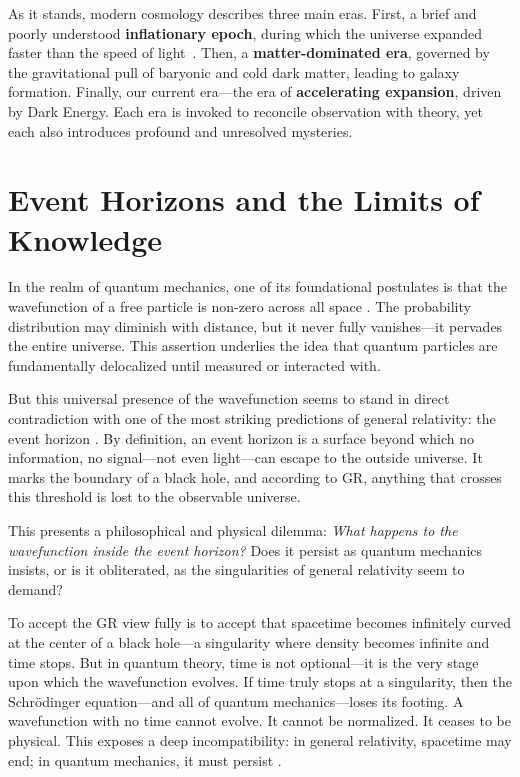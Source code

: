\documentclass[12pt]{article}
\begin{document}
As it stands, modern cosmology describes three main eras. First, a brief and poorly understood \textbf{inflationary epoch}, during which the universe expanded faster than the speed of light~\citep{guth1981}. Then, a \textbf{matter-dominated era}, governed by the gravitational pull of baryonic and cold dark matter, leading to galaxy formation. Finally, our current era---the era of \textbf{accelerating expansion}, driven by Dark Energy. Each era is invoked to reconcile observation with theory, yet each also introduces profound and unresolved mysteries.


\section{Event Horizons and the Limits of Knowledge}

In the realm of quantum mechanics, one of its foundational postulates is that the wavefunction of a free particle is non-zero across all space \citep{libretexts_qm_postulates}. The probability distribution may diminish with distance, but it never fully vanishes---it pervades the entire universe. This assertion underlies the idea that quantum particles are fundamentally delocalized until measured or interacted with.

But this universal presence of the wavefunction seems to stand in direct contradiction with one of the most striking predictions of general relativity: the event horizon \citep{britannica_event_horizon, schwarzschild1916}. By definition, an event horizon is a surface beyond which no information, no signal---not even light---can escape to the outside universe. It marks the boundary of a black hole, and according to GR, anything that crosses this threshold is lost to the observable universe.

This presents a philosophical and physical dilemma: \textit{What happens to the wavefunction inside the event horizon?} Does it persist as quantum mechanics insists, or is it obliterated, as the singularities of general relativity seem to demand?

To accept the GR view fully is to accept that spacetime becomes infinitely curved at the center of a black hole---a singularity where density becomes infinite and time stops. But in quantum theory, time is not optional---it is the very stage upon which the wavefunction evolves. If time truly stops at a singularity, then the Schrödinger equation---and all of quantum mechanics---loses its footing. A wavefunction with no time cannot evolve. It cannot be normalized. It ceases to be physical. This exposes a deep incompatibility: in general relativity, spacetime may end; in quantum mechanics, it must persist \citep{hawking1976}.
\end{document}
